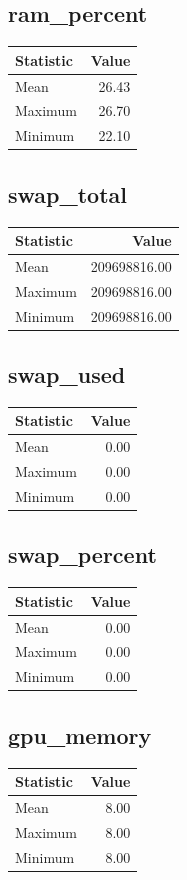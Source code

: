 \documentclass[11pt]{article}
\begin{document}
\subsection{ram_percent}
\begin{tabular}{lr}
\toprule
Statistic & Value \\
\midrule
Mean & 26.43 \\
Maximum & 26.70 \\
Minimum & 22.10 \\
\bottomrule
\end{tabular}


\subsection{swap_total}
\begin{tabular}{lr}
\toprule
Statistic & Value \\
\midrule
Mean & 209698816.00 \\
Maximum & 209698816.00 \\
Minimum & 209698816.00 \\
\bottomrule
\end{tabular}


\subsection{swap_used}
\begin{tabular}{lr}
\toprule
Statistic & Value \\
\midrule
Mean & 0.00 \\
Maximum & 0.00 \\
Minimum & 0.00 \\
\bottomrule
\end{tabular}


\subsection{swap_percent}
\begin{tabular}{lr}
\toprule
Statistic & Value \\
\midrule
Mean & 0.00 \\
Maximum & 0.00 \\
Minimum & 0.00 \\
\bottomrule
\end{tabular}


\subsection{gpu_memory}
\begin{tabular}{lr}
\toprule
Statistic & Value \\
\midrule
Mean & 8.00 \\
Maximum & 8.00 \\
Minimum & 8.00 \\
\bottomrule
\end{tabular}
\end{document}
